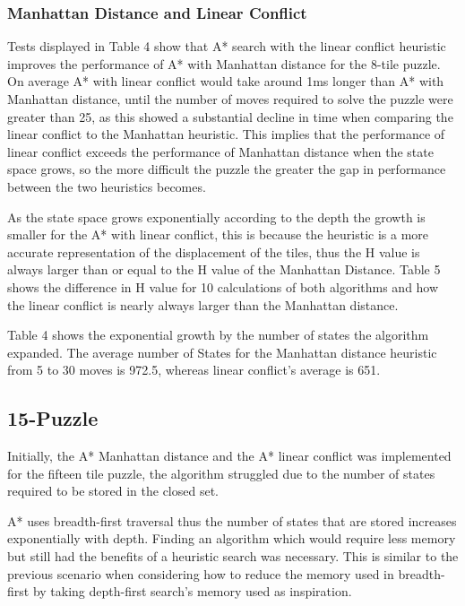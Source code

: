 \documentclass[final]{cmpreport}
\begin{document}
\subsubsection{Manhattan Distance and Linear Conflict}
Tests displayed in Table 4 show that A* search with the linear conflict heuristic improves the performance of A* with Manhattan distance for the 8-tile puzzle. On average A* with linear conflict would take around 1ms longer than A* with Manhattan distance, until the number of moves required to solve the puzzle were greater than 25, as this showed a substantial decline in time when comparing the linear conflict to the Manhattan heuristic. This implies that the performance of linear conflict exceeds the performance of Manhattan distance when the state space grows, so the more difficult the puzzle the greater the gap in performance between the two heuristics becomes.

As the state space grows exponentially according to the depth the growth is smaller for the A* with linear conflict, this is because the heuristic is a more accurate representation of the displacement of the tiles, thus the H value is always larger than or equal to the H value of the Manhattan Distance. Table 5 shows the difference in H value for 10 calculations of both algorithms and how the linear conflict is nearly always larger than the Manhattan distance.

Table 4 shows the exponential growth by the number of states the algorithm expanded. The average number of States for the Manhattan distance heuristic from 5 to 30 moves is 972.5, whereas linear conflict's average is 651.





\subsection{15-Puzzle}

Initially, the A* Manhattan distance and the A* linear conflict  was implemented for the fifteen tile puzzle, the algorithm struggled due to the number of states required to be stored in the closed set. 

A* uses breadth-first traversal thus the number of states that are stored increases exponentially with depth. Finding an algorithm which would require less memory but still had the benefits of a heuristic search was necessary. This is similar to the previous scenario when considering how to reduce the memory used in breadth-first by taking depth-first search's memory used as inspiration.
\end{document}
